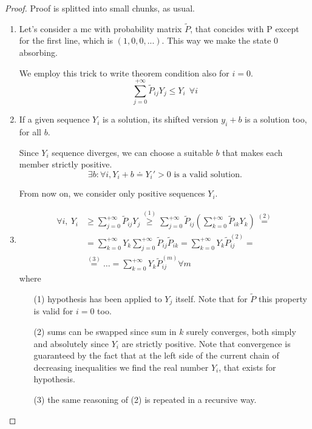	\begin{proof}
		Proof is splitted into small chunks, as usual.

		\begin{enumerate}
		\item Let's consider a \gls{mc} with probability matrix $\tilde{P}$, that concides with P except for the first line, which is $(1, 0, 0, ...)$.
		This way we make the state 0 absorbing.

		We employ this trick to write theorem condition also for $i=0$.
		$$ \sum_{j=0}^{+\infty} \tilde{P}_{ij} Y_j \le Y_i ~~ \forall i$$

		\item If a given sequence $Y_i$ is a solution, its shifted version $y_i + b$ is a solution too, for all $b$.

		Since $Y_i$ sequence diverges, we can choose a suitable $b$ that makes each member strictly positive.
		\begin{equation}
			\exists b: \forall i, Y_i + b \doteq Y_i' > 0 \text{ is a valid solution.}
		\end{equation}

		From now on, we consider only positive sequences $Y_i$.

		\item \begin{equation}\begin{split}
			\forall i, ~ Y_i & \ge \sum_{j=0}^{+\infty} \tilde{P}_{ij} Y_j \stackrel{(1)}{\ge}
			\sum_{j=0}^{+\infty} \tilde{P}_{ij} \left( \sum_{k=0}^{+\infty} \tilde{P}_{ik} Y_k \right) \stackrel{(2)}{=} \\
			& = \sum_{k=0}^{+\infty} Y_k \sum_{j=0}^{+\infty} \tilde{P}_{ij}  \tilde{P}_{ik} =
			\sum_{k=0}^{+\infty} Y_k \tilde{P}_{ij}^{(2)} = \\
			& \stackrel{(3)}{=} \ldots = \sum_{k=0}^{+\infty} Y_k \tilde{P}_{ij}^{(m)} \forall m
		\end{split}\end{equation}
		where
		\begin{itemize}
			\item [(1)] hypothesis has been applied to $Y_j$ itself. Note that for $\tilde{P}$ this property is valid for $i=0$ too.
			\item [(2)] sums can be swapped since sum in $k$ surely converges, both simply and absolutely since $Y_i$ are strictly positive. Note that convergence is guaranteed by the fact that at the left side of the current chain of decreasing inequalities we find the real number $Y_i$, that exists for hypothesis.
			\item [(3)] the same reasoning of (2) is repeated in a recursive way.
		\end{itemize}


\end{enumerate}
\end{proof}
